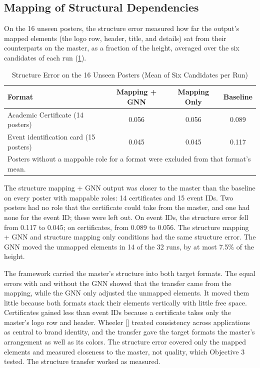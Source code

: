 \begin{refsection}
\clearpage
\subsection{Mapping of Structural Dependencies}

On the 16 unseen posters, the structure error measured how far the output's mapped elements (the logo row, header, title, and details) sat from their counterparts on the master, as a fraction of the height, averaged over the six candidates of each run (\ref{tab:structure-error}).

\begin{table}[!ht]
\centering
\caption{Structure Error on the 16 Unseen Posters (Mean of Six Candidates per Run)}
\label{tab:structure-error}
\begin{tabular}{l c c c}
\hline
\textbf{Format} & \textbf{Mapping + GNN} & \textbf{Mapping Only} & \textbf{Baseline} \\ \hline
Academic Certificate (14 posters) & 0.056 & 0.056 & 0.089 \\
Event identification card (15 posters) & 0.045 & 0.045 & 0.117 \\ \hline
\multicolumn{4}{p{0.80\textwidth}}{\footnotesize Posters without a mappable role for a format were excluded from that format's mean.}
\end{tabular}
\end{table}

The structure mapping + GNN output was closer to the master than the baseline on every poster with mappable roles: 14 certificates and 15 event IDs. Two posters had no role that the certificate could take from the master, and one had none for the event ID; these were left out. On event IDs, the structure error fell from 0.117 to 0.045; on certificates, from 0.089 to 0.056. The structure mapping + GNN and structure mapping only conditions had the same structure error. The GNN moved the unmapped elements in 14 of the 32 runs, by at most 7.5\% of the height.

The framework carried the master's structure into both target formats. The equal errors with and without the GNN showed that the transfer came from the mapping, while the GNN only adjusted the unmapped elements. It moved them little because both formats stack their elements vertically with little free space. Certificates gained less than event IDs because a certificate takes only the master's logo row and header. Wheeler [\citeyear{wheeler2013designing}] treated consistency across applications as central to brand identity, and the transfer gave the target formats the master's arrangement as well as its colors. The structure error covered only the mapped elements and measured closeness to the master, not quality, which Objective 3 tested. The structure transfer worked as measured.


\end{refsection}
